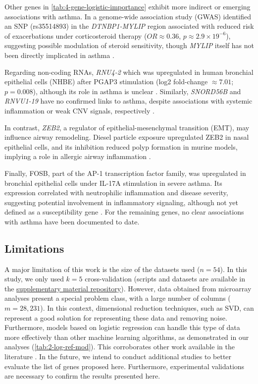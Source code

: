 Other genes in \autoref{tab:4-gene-logistic-importance} exhibit more indirect or emerging associations with asthma. In a genome-wide association study (GWAS) identified an SNP (rs35514893) in the \textit{DTNBP1-MYLIP} region associated with reduced risk of exacerbations under corticosteroid therapy ($OR \approx 0.36$, $p \approx 2.9 \times 19^{-6}$), suggesting possible modulation of steroid sensitivity, though \textit{MYLIP} itself has not been directly implicated in asthma %
\cite{hernandez_2019}.

Regarding non-coding RNAs, \textit{RNU4-2} which was upregulated in human bronchial epithelial cells (NHBE) after PGAP3 stimulation (log2 fold-change $\approx7.01$; $p = 0.008$), although its role in asthma is unclear %
\cite{leslie_pgap3_2024}. Similarly, \textit{SNORD56B} and \textit{RNVU1-19} have no confirmed links to asthma, despite associations with systemic inflammation or weak CNV signals, respectively %
\cite{Vishnyakova_2022,fawcett_exome-wide_2022}.

In contrast, \textit{ZEB2}, a regulator of epithelial-mesenchymal transition (EMT), may influence airway remodeling. Diesel particle exposure upregulated ZEB2 in nasal epithelial cells, and its inhibition reduced polyp formation in murine models, implying a role in allergic airway inflammation %
\cite{lee_2022}.

Finally, FOSB, part of the AP-1 transcription factor family, was upregulated in bronchial epithelial cells under IL-17A stimulation in severe asthma. Its expression correlated with neutrophilic inflammation and disease severity, suggesting potential involvement in inflammatory signaling, although not yet defined as a susceptibility gene %
\cite{jakiela_bronchial_2023}. For the remaining genes, no clear associations with asthma have been documented to date.

\subsection{Limitations}

A major limitation of this work is the size of the datasets used ($n = 54$). In this study, we only used $k = 5$ cross-validation (scripts and datasets are available in the \href{https://github.com/LBS-UFMG/asthma_microarray}{supplementary material repository}). However, data obtained from microarray analyses present a special problem class, with a large number of columns ($m = 28,231$). In this context, dimensional reduction techniques, such as SVD, can represent a good solution for representing these data and removing noise. Furthermore, models based on logistic regression can handle this type of data more effectively than other machine learning algorithms, as demonstrated in our analyses (\autoref{tab:2-log-ref-mod}). This corroborates other work available in the literature %
\cite{morais-rodrigues_analysis_2020}. In the future, we intend to conduct additional studies to better evaluate the list of genes proposed here. Furthermore, experimental validations are necessary to confirm the results presented here.

